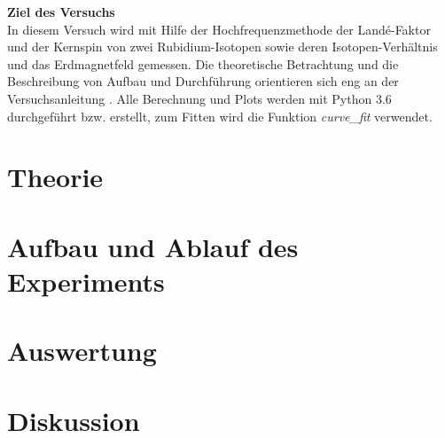 \documentclass[a4,11pt]{article}
\newcommand{\V}{V21}
\begin{document}



\tableofcontents
\clearpage



\textbf{Ziel des Versuchs} \\
In diesem Versuch wird mit Hilfe der Hochfrequenzmethode der Landé-Faktor und der Kernspin von zwei Rubidium-Isotopen sowie deren Isotopen-Verhältnis und das Erdmagnetfeld gemessen.
Die theoretische Betrachtung und die Beschreibung von Aufbau und Durchführung orientieren sich eng an der Versuchsanleitung \cite{\V}. Alle Berechnung und Plots werden mit Python 3.6 durchgeführt bzw. erstellt, zum Fitten wird die Funktion \textit{curve\_fit} verwendet.

\section{Theorie}

\clearpage


\section{Aufbau und Ablauf des Experiments}

\clearpage


\section{Auswertung}

\clearpage


\section{Diskussion}


\clearpage
\listoftodos
\listoffigures
\listoftables
\clearpage
\nocite{\V}
\printbibliography[title = Literaturverzeichnis]
\end{document}
